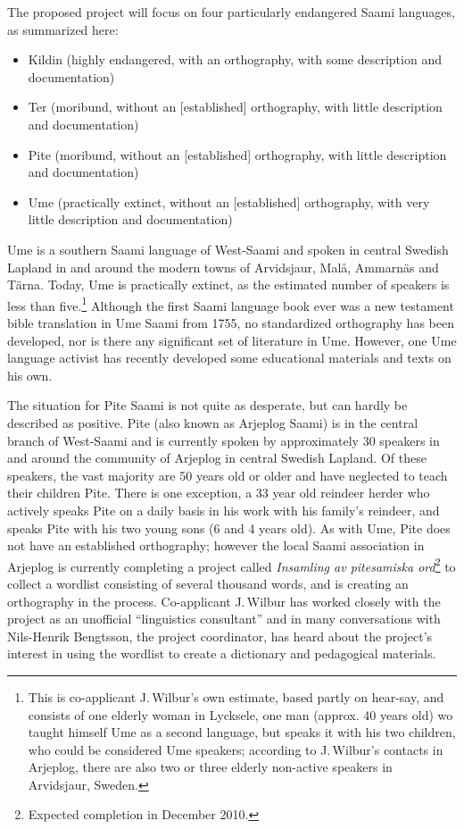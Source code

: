 \documentclass[a4paper,12pt]{article}
\begin{document}
The proposed project will focus on four particularly endangered Saami languages, as summarized here:
\begin{itemize}
\item Kildin (highly endangered, with an orthography, with some description and documentation)
\item Ter (moribund, without an [established] orthography, with little description and documentation)
\item Pite (moribund, without an [established] orthography, with little description and documentation)
\item Ume (practically extinct, without an [established] orthography, with very little description and documentation)
\end{itemize}

Ume is a southern Saami language of West-Saami and spoken in central Swedish Lapland in and around the modern towns of Arvidsjaur, Malå, Ammarnäs and Tärna. Today, Ume is practically extinct, as the estimated number of speakers is less than five.\footnote{This is co-applicant J.\,Wilbur's own estimate, based partly on hear-say, and consists of one elderly woman in Lycksele, one man (approx. 40 years old) wo taught himself Ume as a second language, but speaks it with his two children, who could be considered Ume speakers; according to J.\,Wilbur's contacts in Arjeplog, there are also two or three elderly non-active speakers in Arvidsjaur, Sweden.} Although the first Saami language book ever was a new testament bible translation in Ume Saami from 1755, no standardized orthography has been developed, nor is there any significant set of literature in Ume. However, one Ume language activist has recently developed some educational materials and texts on his own.

The situation for Pite Saami is not quite as desperate, but can hardly be described as positive. Pite (also known as Arjeplog Saami) is in the central branch of West-Saami and is currently spoken by approximately 30 speakers in and around the community of Arjeplog in central Swedish Lapland. Of these speakers, the vast majority are 50 years old or older and have neglected to teach their children Pite. There is one exception, a 33 year old reindeer herder who actively speaks Pite on a daily basis in his work with his family's reindeer, and speaks Pite with his two young sons (6 and 4 years old). As with Ume, Pite does not have an established orthography; however the local Saami association in Arjeplog is currently completing a project called \textit{Insamling av pitesamiska ord}\footnote{Expected completion in December 2010.} to collect a wordlist consisting of several thousand words, and is creating an orthography in the process. Co-applicant J.\,Wilbur has worked closely with the project as an unofficial “linguistics consultant” and in many conversations with Nils-Henrik Bengtsson, the project coordinator, has heard about the project's interest in using the wordlist to create a dictionary and pedagogical materials.
\end{document}
